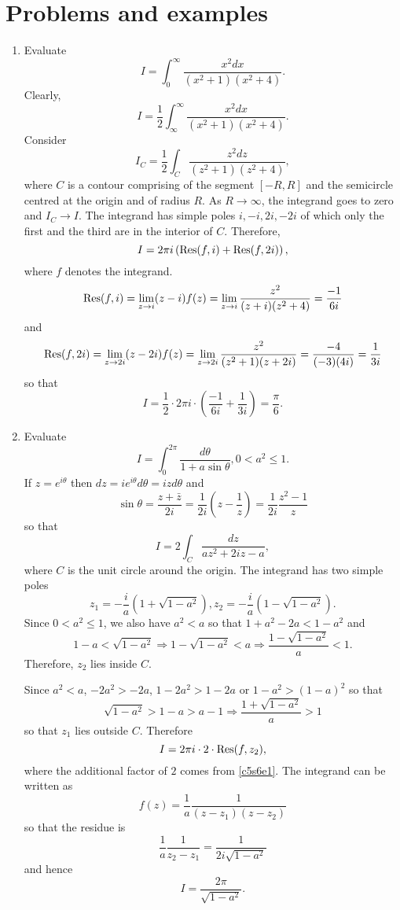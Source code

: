\section{Problems and examples}\label{c5s6}
\begin{enumerate}
\item Evaluate \cite{dk}
\[
I = \int_0^\infty \frac{x^2dx}{(x^2 + 1)(x^2 + 4)}.
\]
Clearly,
\[
I = \frac{1}{2}\int_{\infty}^\infty \frac{x^2dx}{(x^2 + 1)(x^2 + 4)}.
\]
Consider
\[
I_C = \frac{1}{2}\int_C \frac{z^2dz}{(z^2 + 1)(z^2 + 4)},
\]
where $C$ is a contour comprising of the segment $[-R, R]$ and the semicircle centred
at the origin and of radius $R$. As $R \rightarrow \infty$, the integrand goes to
zero and $I_C \rightarrow I$. The integrand has simple poles $i, -i, 2i, -2i$ of which
only the first and the third are in the interior of $C$. Therefore,
\[
I = 2\pi i\left(\operatorname{Res}(f, i) + \operatorname{Res}(f, 2i)\right),
\]
where $f$ denotes the integrand. 
\[
\operatorname{Res}(f, i) = \lim_{z \rightarrow i}(z - i)f(z) = 
\lim_{z \rightarrow i}\frac{z^2}{(z+i)(z^2+4)} = \frac{-1}{6i}
\]
and
\[
\operatorname{Res}(f, 2i) = \lim_{z \rightarrow 2i}(z - 2i)f(z) = 
\lim_{z \rightarrow 2i}\frac{z^2}{(z^2+1)(z+2i)} = \frac{-4}{(-3)(4i)} = \frac{1}{3i}
\]
so that
\[
I = \frac{1}{2}\cdot 2\pi i \cdot \left(\frac{-1}{6i} + \frac{1}{3i}\right) = \frac{\pi}{6}.
\]

\item Evaluate \cite{dk}
\[
I = \int_0^{2\pi}\frac{d\theta}{1 + a\sin\theta}, 0 < a^2 \le 1.
\]
If $z = e^{i\theta}$ then $dz = ie^{i\theta}d\theta = izd\theta$ and
\[
\sin\theta = \frac{z + \bar{z}}{2i} = \frac{1}{2i}\left(z - \frac{1}{z}\right) =
\frac{1}{2i}\frac{z^2 - 1}{z}
\]
so that
\begin{equation}\label{c5s6e1}
I = 2\int_C \frac{dz}{az^2+2iz-a},
\end{equation}
where $C$ is the unit circle around the origin. The integrand has two simple poles
\[
z_1 = -\frac{i}{a}(1 + \sqrt{1 - a^2}), z_2 = -\frac{i}{a}(1 - \sqrt{1 - a^2}).
\]
Since $0 < a^2 \le 1$, we also have $a^2 < a$ so that $1 + a^2 - 2a < 1 - a^2$ and
\[
1 - a < \sqrt{1 - a^2} \Rightarrow 1 - \sqrt{1 - a^2} < a \Rightarrow
\frac{1 - \sqrt{1 - a^2}}{a} < 1.
\]
Therefore, $z_2$ lies inside $C$.

Since $a^2 < a$, $-2a^2 > -2a$, $1 - 2a^2 > 1 - 2a$ or $1 - a^2 > (1 - a)^2$ so that
\[
\sqrt{1 - a^2} > 1 - a > a - 1 \Rightarrow \frac{ 1 + \sqrt{1 - a^2}}{a} > 1
\]
so that $z_1$ lies outside $C$. Therefore
\[
I = 2\pi i \cdot 2 \cdot \operatorname{Res}(f, z_2),
\]
where the additional factor of $2$ comes from \eqref{c5s6e1}. The integrand can be 
written as 
\[
f(z) = \frac{1}{a}\frac{1}{(z-z_1)(z-z_2)}
\]
so that the residue is
\[
\frac{1}{a}\frac{1}{z_2 - z_1} = \frac{1}{2i\sqrt{1-a^2}}
\]
and hence
\[
I = \frac{2\pi}{\sqrt{1 - a^2}}.
\]


\end{enumerate}
